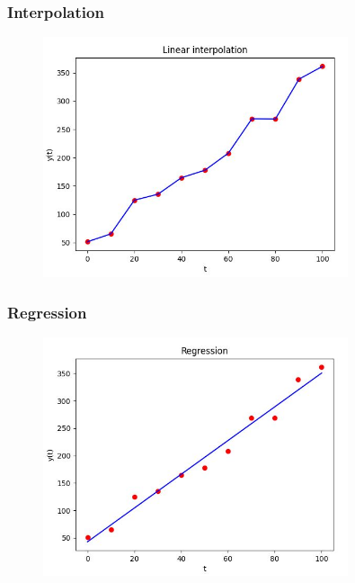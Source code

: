 \documentclass[english,14pt]{beamer}
\begin{document}

\begin{frame}[fragile]

\frametitle{Interpolation}

\vspace*{-3mm}
\begin{figure}[ht]
	\centering
	\includegraphics[width=0.8\textwidth]{figures/Week6MonLinearInterp}
\end{figure}

\end{frame}


\begin{frame}[fragile]

\frametitle{Regression}

\vspace*{-3mm}
\begin{figure}[ht]
	\centering
	\includegraphics[width=0.8\textwidth]{figures/Week6MonLinearRegression}
\end{figure}

\end{frame}
\end{document}
